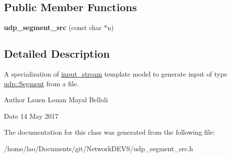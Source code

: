 \subsection*{Public Member Functions}
\begin{DoxyCompactItemize}
\item 
{\bfseries udp\+\_\+segment\+\_\+src} (const char $\ast$n)\hypertarget{classudp__segment__src_a22edeab46f4ea63b712b4236d773848a}{}\label{classudp__segment__src_a22edeab46f4ea63b712b4236d773848a}

\end{DoxyCompactItemize}


\subsection{Detailed Description}
A specialization of \hyperlink{classinput__stream}{input\+\_\+stream} template model to generate input of type \hyperlink{structudp_1_1Segment}{udp\+::\+Segment} from a file. 

\begin{DoxyAuthor}{Author}
Lauen Louan Mayal Belloli 
\end{DoxyAuthor}
\begin{DoxyDate}{Date}
14 May 2017 
\end{DoxyDate}


The documentation for this class was generated from the following file\+:\begin{DoxyCompactItemize}
\item 
/home/lao/\+Documents/git/\+Network\+D\+E\+V\+S/udp\+\_\+segment\+\_\+src.\+h\end{DoxyCompactItemize}
